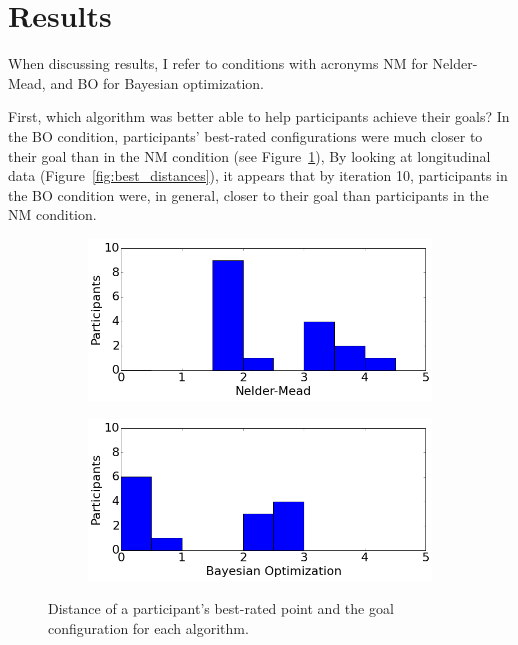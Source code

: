 \section{Results}

When discussing results, I refer to conditions with acronyms NM for Nelder-Mead, and BO for Bayesian optimization.

First, which algorithm was better able to help participants achieve their goals?
In the BO condition, participants' best-rated configurations were much closer to their goal than in the NM condition (see Figure~\ref{fig:bestfits}),
By looking at longitudinal data (Figure~\ref{fig:best_distances}), it appears that by iteration 10, participants in the BO condition were, in general, closer to their goal than participants in the NM condition.

\begin{figure}
  \centering
  \begin{subfigure}[b]{0.23\textwidth}
    \includegraphics[width=\textwidth]{figures/bestfits_nm}
  \end{subfigure}
  \begin{subfigure}[b]{0.23\textwidth}
    \includegraphics[width=\textwidth]{figures/bestfits_bo}
  \end{subfigure}
  \caption{Distance of a participant's best-rated point and the goal configuration for each algorithm.}\label{fig:bestfits}
\end{figure}

